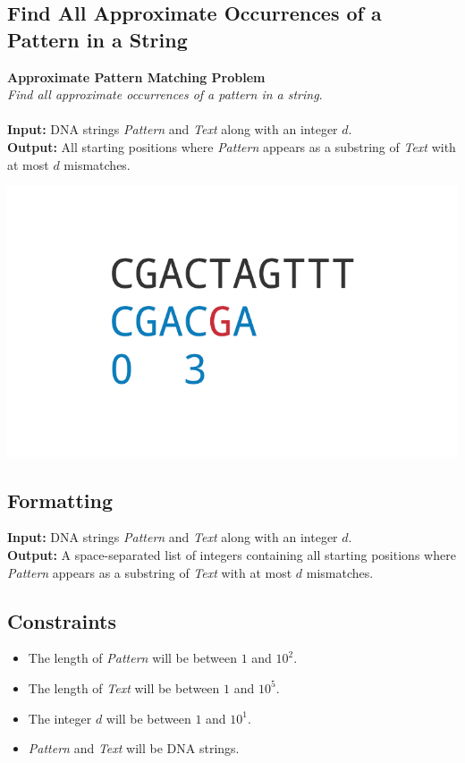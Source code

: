 \documentclass{article}
\begin{document}
\subsection{Find All Approximate Occurrences of a Pattern in a String}
\hline\vspace{5}
\noindent \textbf{Approximate Pattern Matching Problem}\\
\emph{Find all approximate occurrences of a pattern in a string}.\\ \\
\textbf{Input:} DNA strings \emph{Pattern} and \emph{Text} along with an integer $d$.\\
\textbf{Output:} All starting positions where \emph{Pattern} appears as a substring of \emph{Text} with at most $d$ mismatches.
\begin{center}
    \includegraphics[scale=0.2]{c1/logos/1H.png} 
\end{center}
\hline\vspace{5}

\subsection*{Formatting}
\textbf{Input:} DNA strings \emph{Pattern} and \emph{Text} along with an integer $d$.\\
\noindent \textbf{Output:} A space-separated list of integers containing all starting positions where \emph{Pattern} appears as a substring of \emph{Text} with at most $d$ mismatches.

\subsection*{Constraints}
\begin{itemize}
    \item The length of \emph{Pattern} will be between $1$ and $10^2$.
    \item The length of \emph{Text} will be between $1$ and $10^5$.
    \item The integer $d$ will be between $1$ and $10^1$.
    \item \emph{Pattern} and \emph{Text} will be DNA strings.
\end{itemize}
\pagebreak
\end{document}
